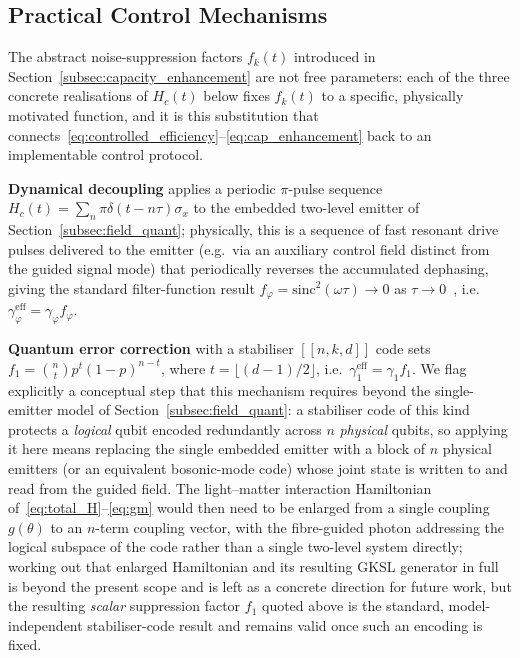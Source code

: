 \documentclass[journal,twocolumn]{IEEEtran}
\theoremstyle{definition}
\theoremstyle{plain}
\begin{document}
\subsection{Practical Control Mechanisms}

The abstract noise-suppression factors $f_k(t)$ introduced in
Section~\ref{subsec:capacity_enhancement} are not free parameters:
each of the three concrete realisations of $H_c(t)$ below fixes
$f_k(t)$ to a specific, physically motivated function, and it is
this substitution that connects~\eqref{eq:controlled_efficiency}--\eqref{eq:cap_enhancement}
back to an implementable control protocol.

\textbf{Dynamical decoupling} applies a periodic
$\pi$-pulse sequence $H_c(t) = \sum_n \pi\delta(t-n\tau)\sigma_x$ to
the embedded two-level emitter of Section~\ref{subsec:field_quant};
physically, this is a sequence of fast resonant drive pulses
delivered to the emitter (e.g.\ via an auxiliary control field
distinct from the guided signal mode) that periodically reverses the
accumulated dephasing, giving the standard filter-function result
$f_\varphi = \mathrm{sinc}^2(\omega\tau) \to 0$ as $\tau \to
0$~\cite{viola1998}, i.e.\ $\gamma_\varphi^{\mathrm{eff}} =
\gamma_\varphi f_\varphi$.

\textbf{Quantum error correction} with a stabiliser $[[n,k,d]]$
code sets $f_1 = \binom{n}{t} p^t (1-p)^{n-t}$, where $t =
\lfloor(d-1)/2\rfloor$, i.e.\ $\gamma_1^{\mathrm{eff}} = \gamma_1
f_1$. We flag explicitly a conceptual step that this mechanism
requires beyond the single-emitter model of
Section~\ref{subsec:field_quant}: a stabiliser code of this kind
protects a \emph{logical} qubit encoded redundantly across $n$
\emph{physical} qubits, so applying it here means replacing the
single embedded emitter with a block of $n$ physical emitters (or
an equivalent bosonic-mode code) whose joint state is written to
and read from the guided field. The light--matter interaction
Hamiltonian of~\eqref{eq:total_H}--\eqref{eq:gm} would then need to
be enlarged from a single coupling $g(\theta)$ to an $n$-term
coupling vector, with the fibre-guided photon addressing the logical
subspace of the code rather than a single two-level system directly;
working out that enlarged Hamiltonian and its resulting GKSL
generator in full is beyond the present scope and is left as a
concrete direction for future work, but the resulting \emph{scalar}
suppression factor $f_1$ quoted above is the standard,
model-independent stabiliser-code result and remains valid once such
an encoding is fixed.
\end{document}
